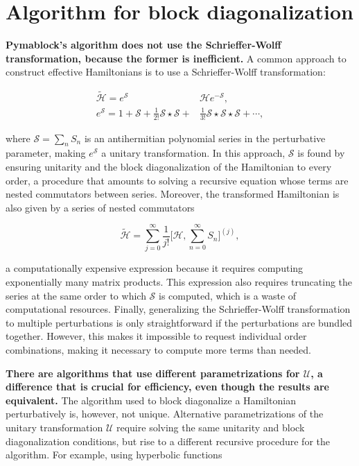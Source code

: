 \section{Algorithm for block diagonalization}

\textbf{Pymablock's algorithm does not use the Schrieffer-Wolff transformation,
because the former is inefficient.}
A common approach to construct effective Hamiltonians is to use a
Schrieffer-Wolff transformation:

\begin{align}
\tilde{\mathcal{H}} = e^\mathcal{S} &\mathcal{H} e^{-\mathcal{S}}, \\
e^{\mathcal{S}} = 1 + \mathcal{S} + \frac{1}{2!} \mathcal{S} \star \mathcal{S}
+ &\frac{1}{3!} \mathcal{S} \star \mathcal{S} \star \mathcal{S} + \cdots,
\end{align}

where $\mathcal{S} = \sum_n S_n$ is an antihermitian polynomial series in the
perturbative parameter, making $e^\mathcal{S}$ a unitary transformation.
In this approach, $\mathcal{S}$ is found by ensuring unitarity and the block
diagonalization of the Hamiltonian to every order, a procedure that amounts to
solving a recursive equation whose terms are nested commutators between series.
Moreover, the transformed Hamiltonian is also given by a series of nested
commutators

\begin{equation}
\tilde{\mathcal{H}} = \sum_{j=0}^\infty \frac{1}{j!} \Big [\mathcal{H}, \sum_{n=0}^{\infty} S_n \Big ]^{(j)},
\end{equation}

a computationally expensive expression because it requires computing
exponentially many matrix products.
This expression also requires truncating the series at the same order
to which $\mathcal{S}$ is computed, which is a waste of computational resources.
Finally, generalizing the Schrieffer-Wolff transformation to multiple
perturbations is only straightforward if the perturbations are bundled
together.
However, this makes it impossible to request individual order combinations,
making it necessary to compute more terms than needed.

\textbf{There are algorithms that use different parametrizations for $\mathcal{U}$, a
difference that is crucial for efficiency, even though the results are
equivalent.}
The algorithm used to block diagonalize a Hamiltonian perturbatively is,
however, not unique.
Alternative parametrizations of the unitary transformation $\mathcal{U}$
require solving the same unitarity and block diagonalization conditions, but
rise to a different recursive procedure for the algorithm.
For example, using hyperbolic functions

